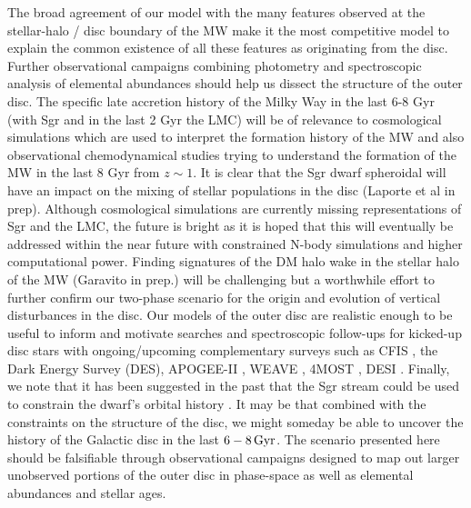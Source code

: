 \documentclass[useAMS,usenatbib]{mnras}
\begin{document}
{\begin{enumerate}
\end{enumerate}

The broad agreement of our model with the many features observed at the stellar-halo / disc boundary of the MW make it the most competitive model to explain the common existence of all these features as originating from the disc. Further observational campaigns combining photometry and spectroscopic analysis of elemental abundances should help us dissect the structure of the outer disc. The specific late accretion history of the Milky Way in the last 6-8 Gyr (with Sgr and in the last 2 Gyr the LMC) will be of relevance to cosmological simulations which are used to interpret the formation history of the MW and also observational chemodynamical studies trying to understand the formation of the MW in the last 8 Gyr from $z\sim1$. It is clear that the Sgr dwarf spheroidal will have an impact on the mixing of stellar populations in the disc (Laporte et al in prep). Although cosmological simulations are currently missing representations of Sgr and the LMC, the future is bright as it is hoped that this will eventually be addressed within the near future with constrained N-body simulations and higher computational power. Finding signatures of the DM halo wake in the stellar halo of the MW (Garavito in prep.) will be challenging but a worthwhile effort to further confirm our two-phase scenario for the origin and evolution of vertical disturbances in the disc. Our models of the outer disc are realistic enough to be useful to inform and motivate searches and spectroscopic follow-ups for kicked-up disc stars with ongoing/upcoming complementary surveys such as CFIS \citep{ibata17,ibata17b}, the Dark Energy Survey (DES), APOGEE-II \citep{zasowski17}, WEAVE \citep{famaey17}, 4MOST  \citep{feltzing17}, DESI \citep{desi16}. Finally, we note that it has been suggested in the past that the Sgr stream could be used to constrain the dwarf's orbital history \citep{johnston99}. It may be that combined with the constraints on the structure of the disc, we might someday be able to uncover the history of the Galactic disc in the last $6-8 \,\rm{Gyr}$. The scenario presented here should be falsifiable through observational campaigns designed to map out larger unobserved portions of the outer disc in phase-space as well as elemental abundances and stellar ages.

}
\end{document}
